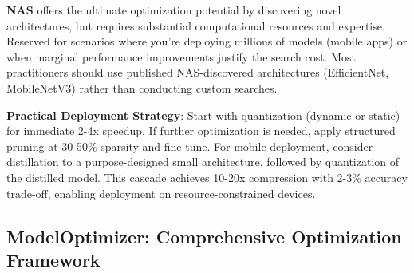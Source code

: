 \textbf{NAS} offers the ultimate optimization potential by discovering novel architectures, but requires substantial computational resources and expertise. Reserved for scenarios where you're deploying millions of models (mobile apps) or when marginal performance improvements justify the search cost. Most practitioners should use published NAS-discovered architectures (EfficientNet, MobileNetV3) rather than conducting custom searches.

\textbf{Practical Deployment Strategy}: Start with quantization (dynamic or static) for immediate 2-4x speedup. If further optimization is needed, apply structured pruning at 30-50\% sparsity and fine-tune. For mobile deployment, consider distillation to a purpose-designed small architecture, followed by quantization of the distilled model. This cascade achieves 10-20x compression with 2-3\% accuracy trade-off, enabling deployment on resource-constrained devices.

\subsection{ModelOptimizer: Comprehensive Optimization Framework}

